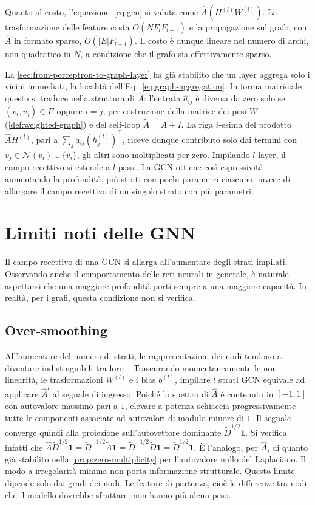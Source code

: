 Quanto al costo, l'equazione~\eqref{eq:gcn} si valuta come $\hat A(H^{(l)}W^{(l)})$. La trasformazione delle feature costa $O(NF_lF_{l+1})$ e la propagazione sul grafo, con $\hat A$ in formato sparso, $O(|E|F_{l+1})$. Il costo è dunque lineare nel numero di archi, non quadratico in $N$, a condizione che il grafo sia effettivamente sparso.

La \cref{sec:from-perceptron-to-graph-layer} ha già stabilito che un layer aggrega solo i vicini immediati, la località dell'Eq.~\eqref{eq:graph-aggregation}. In forma matriciale questo si traduce nella struttura di $\hat A$: l'entrata $\hat a_{ij}$ è diversa da zero solo se $(v_i,v_j)\in E$ oppure $i=j$, per costruzione della matrice dei pesi $W$ (\cref{def:weighted-graph}) e del self-loop $\tilde A=A+I$. La riga $i$-esima del prodotto $\hat A H^{(l)}$, pari a $\sum_j \hat a_{ij}(h_j^{(l)})^\top$, riceve dunque contributo solo dai termini con $v_j\in\mathcal N(v_i)\cup\{v_i\}$, gli altri sono moltiplicati per zero. Impilando $l$ layer, il campo recettivo si estende a $l$ passi. La GCN ottiene così espressività aumentando la profondità, più strati con pochi parametri ciascuno, invece di allargare il campo recettivo di un singolo strato con più parametri.

\section{Limiti noti delle GNN}
\label{sec:known-limitations-gnn}

Il campo recettivo di una GCN si allarga all'aumentare degli strati impilati. Osservando anche il comportamento delle reti neurali in generale, è naturale aspettarsi che una maggiore profondità porti sempre a una maggiore capacità. In realtà, per i grafi, questa condizione non si verifica.

\subsection{Over-smoothing}
All'aumentare del numero di strati, le rappresentazioni dei nodi tendono a diventare indistinguibili tra loro~\cite{li2018deeper}. Trascurando momentaneamente le non linearità, le trasformazioni $W^{(l)}$ e i bias $b^{(l)}$, impilare $l$ strati GCN equivale ad applicare $\hat A^l$ al segnale di ingresso. Poiché lo spettro di $\hat A$ è contenuto in $[-1,1]$ con autovalore massimo pari a $1$, elevare a potenza schiaccia progressivamente tutte le componenti associate ad autovalori di modulo minore di $1$. Il segnale converge quindi alla proiezione sull'autovettore dominante $\tilde D^{1/2}\mathbf{1}$. Si verifica infatti che $\hat A\tilde D^{1/2}\mathbf1 = \tilde D^{-1/2}\tilde A\mathbf1 = \tilde D^{-1/2}\tilde D\mathbf1 = \tilde D^{1/2}\mathbf1$. È l'analogo, per $\hat A$, di quanto già stabilito nella \cref{prop:zero-multiplicity} per l'autovalore nullo del Laplaciano. Il modo a irregolarità minima non porta informazione strutturale. Questo limite dipende solo dai gradi dei nodi. Le feature di partenza, cioè le differenze tra nodi che il modello dovrebbe sfruttare, non hanno più alcun peso.

